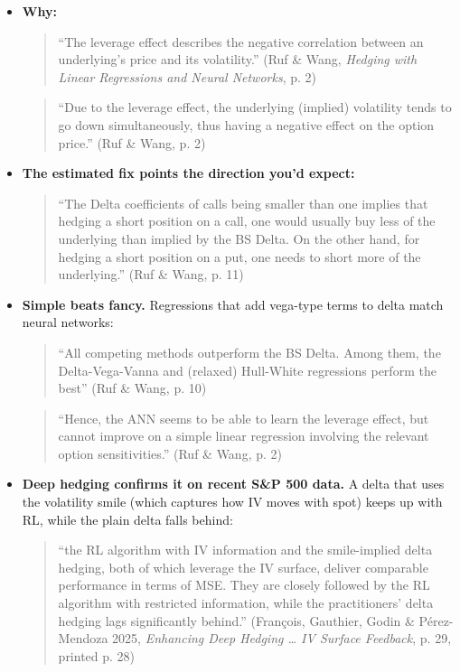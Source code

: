 \documentclass{article}
\begin{document}
\begin{itemize}

\item \textbf{Why:}

\begin{quote}``The leverage effect describes the negative correlation between an underlying's price and its volatility.'' (Ruf \& Wang, \emph{Hedging with Linear Regressions and Neural Networks}, p. 2)\end{quote}

\begin{quote}``Due to the leverage effect, the underlying (implied) volatility tends to go down simultaneously, thus having a negative effect on the option price.'' (Ruf \& Wang, p. 2)\end{quote}

\item \textbf{The estimated fix points the direction you'd expect:}

\begin{quote}``The Delta coefficients of calls being smaller than one implies that hedging a short position on a call, one would usually buy less of the underlying than implied by the BS Delta. On the other hand, for hedging a short position on a put, one needs to short more of the underlying.'' (Ruf \& Wang, p. 11)\end{quote}

\item \textbf{Simple beats fancy.} Regressions that add vega-type terms to delta match neural networks:

\begin{quote}``All competing methods outperform the BS Delta. Among them, the Delta-Vega-Vanna and (relaxed) Hull-White regressions perform the best'' (Ruf \& Wang, p. 10)\end{quote}

\begin{quote}``Hence, the ANN seems to be able to learn the leverage effect, but cannot improve on a simple linear regression involving the relevant option sensitivities.'' (Ruf \& Wang, p. 2)\end{quote}

\item \textbf{Deep hedging confirms it on recent S\&P 500 data.} A delta that uses the volatility smile (which captures how IV moves with spot) keeps up with RL, while the plain delta falls behind:

\begin{quote}``the RL algorithm with IV information and the smile-implied delta hedging, both of which leverage the IV surface, deliver comparable performance in terms of MSE. They are closely followed by the RL algorithm with restricted information, while the practitioners' delta hedging lags significantly behind.'' (François, Gauthier, Godin \& Pérez-Mendoza 2025, \emph{Enhancing Deep Hedging \ldots{} IV Surface Feedback}, p. 29, printed p. 28)\end{quote}


\end{itemize}
\end{document}
